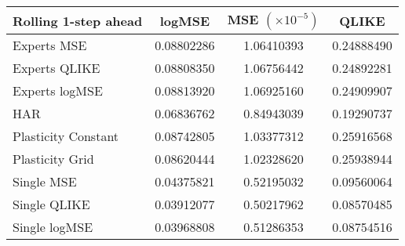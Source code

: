 
\begin{tabular}{l|c|c|c}
Rolling 1-step ahead     & logMSE & MSE $(\times 10^{-5})$ & QLIKE \\\hline
Experts MSE & 0.08802286 & 1.06410393 & 0.24888490\\ 
Experts QLIKE & 0.08808350 & 1.06756442 & 0.24892281\\ 
Experts logMSE & 0.08813920 & 1.06925160 & 0.24909907\\ 
HAR & 0.06836762 & 0.84943039 & 0.19290737\\ 
Plasticity Constant & 0.08742805 & 1.03377312 & 0.25916568\\ 
Plasticity Grid & 0.08620444 & 1.02328620 & 0.25938944\\ 
Single MSE & 0.04375821 & 0.52195032 & 0.09560064\\ 
Single QLIKE & 0.03912077 & 0.50217962 & 0.08570485\\ 
Single logMSE & 0.03968808 & 0.51286353 & 0.08754516\\ 
\end{tabular}